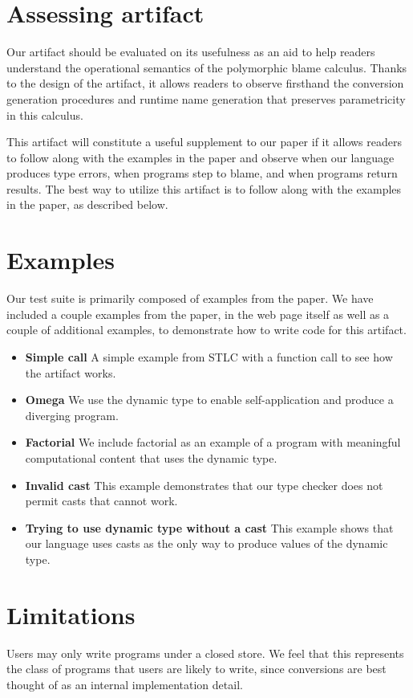 \documentclass[11pt,numbers,nocopyrightspace,acmlarge,anonymous]{acmart}
\begin{document}
\section{Assessing artifact}

Our artifact should be evaluated on its usefulness
as an aid to help readers understand 
the operational semantics of the polymorphic blame calculus.
Thanks to the design of the artifact,
it allows readers to observe firsthand the
conversion generation procedures and 
runtime name generation that preserves parametricity in
this calculus.

This artifact will constitute a useful supplement
to our paper if it allows readers to follow along
with the examples in the paper and observe when
our language produces type errors,
when programs step to blame,
and when programs return results.
The best way to utilize this artifact is to
follow along with the examples in the paper,
as described below.

\section{Examples}

Our test suite is primarily composed of examples from
the paper. We have included a couple examples from the paper,
in the web page itself 
as well as a couple of additional examples,
to demonstrate how to write code for this artifact. 

\begin{itemize}
\item \textbf{Simple call} 
	A simple example from STLC with a function call
	to see how the artifact works.
\item \textbf{Omega} We use the dynamic type to 
	enable self-application and produce a diverging program.
\item \textbf{Factorial} We include factorial
	as an example of a program with meaningful computational
	content that uses the dynamic type.
\item \textbf{Invalid cast} This example demonstrates
	that our type checker does not permit casts
	that cannot work.
\item \textbf{Trying to use dynamic type without a cast}
	This example shows that our language uses casts
	as the only way to produce values of the dynamic type.
\end{itemize}


\section{Limitations}
Users may only write programs under a closed store.
We feel that this represents the class of programs
that users are likely to write, since conversions
are best thought of as an internal implementation detail.
\end{document}
